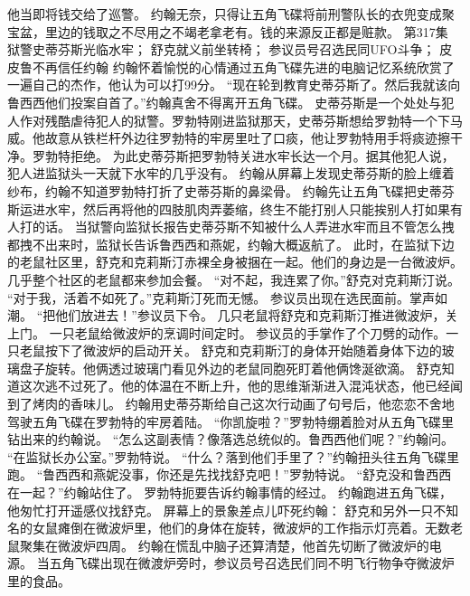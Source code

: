 \documentclass[a4paper,12pt,UTF8,twoside]{ctexbook}
\begin{document}
        他当即将钱交给了巡警。  
        约翰无奈，只得让五角飞碟将前刑警队长的衣兜变成聚宝盆，里边的钱取之不尽用之不竭老拿老有。钱的来源反正都是赃款。          第317集  
        狱警史蒂芬斯光临水牢；  
        舒克就义前坐转椅；  
        参议员号召选民同UFO斗争；  
        皮皮鲁不再信任约翰    
        约翰怀着愉悦的心情通过五角飞碟先进的电脑记忆系统欣赏了一遍自己的杰作，他认为可以打99分。  
        “现在轮到教育史蒂芬斯了。然后我就该向鲁西西他们投案自首了。”约翰真舍不得离开五角飞碟。  
        史蒂芬斯是一个处处与犯人作对残酷虐待犯人的狱警。罗勃特刚进监狱那天，史蒂芬斯想给罗勃特一个下马威。他故意从铁栏杆外边往罗勃特的牢房里吐了口痰，他让罗勃特用手将痰迹擦干净。罗勃特拒绝。  
        为此史蒂芬斯把罗勃特关进水牢长达一个月。据其他犯人说，犯人进监狱头一天就下水牢的几乎没有。  
        约翰从屏幕上发现史蒂芬斯的脸上缠着纱布，约翰不知道罗勃特打折了史蒂芬斯的鼻梁骨。  
        约翰先让五角飞碟把史蒂芬斯运进水牢，然后再将他的四肢肌肉弄萎缩，终生不能打别人只能挨别人打如果有人打的话。  
        当狱警向监狱长报告史蒂芬斯不知被什么人弄进水牢而且不管怎么拽都拽不出来时，监狱长告诉鲁西西和燕妮，约翰大概返航了。  
        此时，在监狱下边的老鼠社区里，舒克和克莉斯汀赤裸全身被捆在一起。他们的身边是一台微波炉。  
        几乎整个社区的老鼠都来参加会餐。  
        “对不起，我连累了你。”舒克对克莉斯汀说。  
        “对于我，活着不如死了。”克莉斯汀死而无憾。  
        参议员出现在选民面前。掌声如潮。  
        “把他们放进去！”参议员下令。  
        几只老鼠将舒克和克莉斯汀推进微波炉，关上门。  
        一只老鼠给微波炉的烹调时间定时。  
        参议员的手掌作了个刀劈的动作。一只老鼠按下了微波炉的启动开关。        
        舒克和克莉斯汀的身体开始随着身体下边的玻璃盘子旋转。他俩透过玻璃门看见外边的老鼠同胞死盯着他俩馋涎欲滴。  
        舒克知道这次逃不过死了。他的体温在不断上升，他的思维渐渐进入混沌状态，他已经闻到了烤肉的香味儿。  
        约翰用史蒂芬斯给自己这次行动画了句号后，他恋恋不舍地驾驶五角飞碟在罗勃特的牢房着陆。  
        “你凯旋啦？”罗勃特绷着脸对从五角飞碟里钻出来的约翰说。  
        “怎么这副表情？像落选总统似的。鲁西西他们呢？”约翰问。  
        “在监狱长办公室。”罗勃特说。  
        “什么？落到他们手里了？”约翰扭头往五角飞碟里跑。  
        “鲁西西和燕妮没事，你还是先找找舒克吧！”罗勃特说。  
        “舒克没和鲁西西在一起？”约翰站住了。  
        罗勃特扼要告诉约翰事情的经过。  
        约翰跑进五角飞碟，他匆忙打开遥感仪找舒克。  
        屏幕上的景象差点儿吓死约翰：  
        舒克和另外一只不知名的女鼠瘫倒在微波炉里，他们的身体在旋转，微波炉的工作指示灯亮着。无数老鼠聚集在微波炉四周。  
        约翰在慌乱中脑子还算清楚，他首先切断了微波炉的电源。  
        当五角飞碟出现在微渡炉旁时，参议员号召选民们同不明飞行物争夺微波炉里的食品。  
\end{document}
